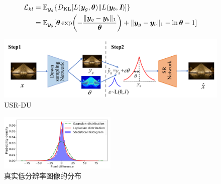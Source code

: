 \begin{equation}
    \begin{aligned}
        \mathcal{L}_{kl}&=\mathbb{E}_{\vb*{y}_g}\{D_{\text{KL}}[L(\vb*{y}_g,\bm{\theta})\|L(\vb*{y}_b,\textbf{\em I})]\}  \\
        &=\mathbb{E}_{\vb*{y}_g}[\bm{\theta}\exp(-\frac{\|\vb*{y}_g-\vb*{y}_b\|_1}{\bm{\theta}})+\|\vb*{y}_g-\vb*{y}_b\|_1-\ln\bm{\theta}-1]
    \end{aligned}
    \label{equ:kl}
\end{equation}


\begin{figure}[htbp]
    \centering
    \includegraphics[width=1.0\textwidth]{imgs/USR-DU.png}
    \caption{USR-DU}
    \label{fig:USR-DU}
\end{figure}

\begin{figure}[htbp]
    \centering
    \includegraphics[width=0.5\textwidth]{imgs/laplace.png}
    \caption{真实低分辨率图像的分布}
    \label{fig:laplace}
\end{figure}


